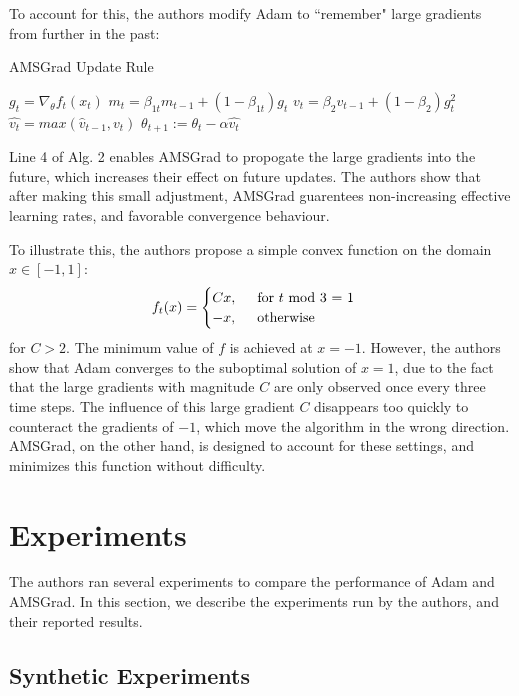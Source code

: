 \documentclass[letterpaper, 10 pt, conference]{ieeeconf}  %
\begin{document}
To account for this, the authors modify Adam to ``remember" large gradients from further in the past:

\begin{algorithm}
\caption{AMSGrad Update Rule}\label{Adam-update}
\begin{algorithmic}[1]
\State $g_t = \nabla_{\theta}f_t(x_t)$
\State $m_t = \beta_{1t}m_{t-1} + (1 - \beta_{1t})g_t$ 
\State $v_t = \beta_2{v_{t-1}} + (1-\beta_2)g_t^2$
\State $\hat{v_t} = max(\hat{v}_{t-1}, v_t)$
\State $\theta_{t + 1} := \theta_t - \alpha{\hat{v_t}}$
\end{algorithmic}
\end{algorithm}

Line 4 of Alg. 2 enables AMSGrad to propogate the large gradients into the future, which increases their effect on future updates. The authors show that after making this small adjustment, AMSGrad guarentees non-increasing effective learning rates, and favorable convergence behaviour.

To illustrate this, the authors propose a simple convex function on the domain $x \in [-1,1]$:
\[
    f_{t}(x) = 
    \begin{cases}
     	Cx, \hspace{5mm} \text{for } t \text{ mod 3 = 1} \\
        -x, \hspace{5mm} \text{otherwise}
    \end{cases}
\]
for $C>2$. The minimum value of $f$ is achieved at $x=-1$. However, the authors show that Adam converges to the suboptimal solution of $x = 1$, due to the fact that the large gradients with magnitude $C$ are only observed once every three time steps. The influence of this large gradient $C$ disappears too quickly to counteract the gradients of $-1$, which move the algorithm in the wrong direction. AMSGrad, on the other hand, is designed to account for these settings, and minimizes this function without difficulty.

\section{Experiments}


The authors ran several experiments to compare the performance of Adam and AMSGrad. In this section, we 
describe the experiments run by the authors, and their reported results. 

\subsection{Synthetic Experiments}
\end{document}
